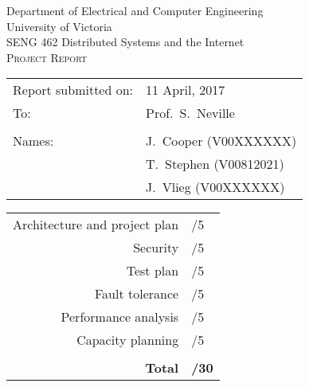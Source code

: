 \begin{titlepage}

  \begin{center}
    \begin{LARGE}
      Department of Electrical and Computer Engineering \\
      University of Victoria \\
      SENG 462 \textemdash{} Distributed Systems and the Internet \\[1cm]
      \textsc{Project Report}
      \\[1in]
    \end{LARGE}
  \end{center}

  \begin{tabular}{ p{} p{} }
    Report submitted on:& 11 April, 2017 \\
    To: & Prof.\ S.\ Neville \\
    & \\
    Names: & J.\ Cooper (V00XXXXXX)\\
    & T.\ Stephen (V00812021)\\
    & J.\ Vlieg (V00XXXXXX)\\[1in]
  \end{tabular}

  \begin{center}
    \begin{tabular}{rl}
      Architecture and project plan & \markline{} /5 \\
      Security & \markline{} /5 \\
      Test plan & \markline{} /5 \\
      Fault tolerance & \markline{} /5 \\
      Performance analysis & \markline{} /5 \\
      Capacity planning & \markline{} /5 \\
      & \\
      \textbf{Total} & \markline{} \textbf{/30} \\
    \end{tabular}
  \end{center}

\end{titlepage}

